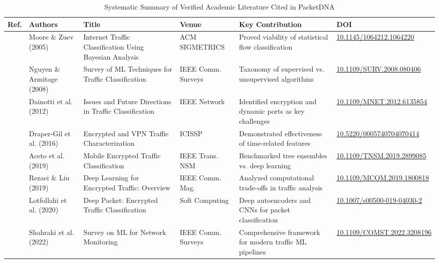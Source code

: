 \documentclass[10pt,journal,compsoc]{IEEEtran}
\begin{document}
\begin{table}[!t]
\centering
\caption{Systematic Summary of Verified Academic Literature Cited in PacketDNA}
\label{tab:literature}
\footnotesize
\begin{tabularx}{\textwidth}{lp{2.4cm}Xp{2.2cm}Xl}
\toprule
\textbf{Ref.} & \textbf{Authors} & \textbf{Title} & \textbf{Venue} & \textbf{Key Contribution} & \textbf{DOI} \\
\midrule
\cite{moore2005internet} & Moore \& Zuev (2005) & Internet Traffic Classification Using Bayesian Analysis & ACM SIGMETRICS & Proved viability of statistical flow classification & \href{https://doi.org/10.1145/1064212.1064220}{10.1145/1064212.1064220} \\
\cite{nguyen2008survey} & Nguyen \& Armitage (2008) & Survey of ML Techniques for Traffic Classification & IEEE Comm. Surveys & Taxonomy of supervised vs. unsupervised algorithms & \href{https://doi.org/10.1109/SURV.2008.080406}{10.1109/SURV.2008.080406} \\
\cite{dainotti2012issues} & Dainotti et al. (2012) & Issues and Future Directions in Traffic Classification & IEEE Network & Identified encryption and dynamic ports as key challenges & \href{https://doi.org/10.1109/MNET.2012.6135854}{10.1109/MNET.2012.6135854} \\
\cite{drapergil2016characterization} & Draper-Gil et al. (2016) & Encrypted and VPN Traffic Characterization & ICISSP & Demonstrated effectiveness of time-related features & \href{https://doi.org/10.5220/0005740704070414}{10.5220/0005740704070414} \\
\cite{aceto2019mobile} & Aceto et al. (2019) & Mobile Encrypted Traffic Classification & IEEE Trans. NSM & Benchmarked tree ensembles vs. deep learning & \href{https://doi.org/10.1109/TNSM.2019.2899085}{10.1109/TNSM.2019.2899085} \\
\cite{rezaei2019deep} & Rezaei \& Liu (2019) & Deep Learning for Encrypted Traffic: Overview & IEEE Comm. Mag. & Analyzed computational trade-offs in traffic analysis & \href{https://doi.org/10.1109/MCOM.2019.1800818}{10.1109/MCOM.2019.1800818} \\
\cite{lotfollahi2020deep} & Lotfollahi et al. (2020) & Deep Packet: Encrypted Traffic Classification & Soft Computing & Deep autoencoders and CNNs for packet classification & \href{https://doi.org/10.1007/s00500-019-04030-2}{10.1007/s00500-019-04030-2} \\
\cite{shahraki2022survey} & Shahraki et al. (2022) & Survey on ML for Network Monitoring & IEEE Comm. Surveys & Comprehensive framework for modern traffic ML pipelines & \href{https://doi.org/10.1109/COMST.2022.3208196}{10.1109/COMST.2022.3208196} \\
\bottomrule
\end{tabularx}
\end{table}
\end{document}
